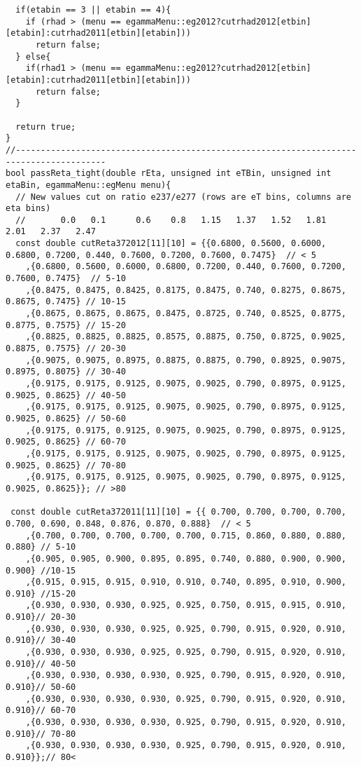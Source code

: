 \begin{lstlisting}
  if(etabin == 3 || etabin == 4){
    if (rhad > (menu == egammaMenu::eg2012?cutrhad2012[etbin][etabin]:cutrhad2011[etbin][etabin]))
      return false;
  } else{
    if(rhad1 > (menu == egammaMenu::eg2012?cutrhad2012[etbin][etabin]:cutrhad2011[etbin][etabin]))
      return false;
  }

  return true;
}
//----------------------------------------------------------------------------------------
bool passReta_tight(double rEta, unsigned int eTBin, unsigned int etaBin, egammaMenu::egMenu menu){
  // New values cut on ratio e237/e277 (rows are eT bins, columns are eta bins)
  //       0.0   0.1      0.6    0.8   1.15   1.37   1.52   1.81    2.01   2.37   2.47
  const double cutReta372012[11][10] = {{0.6800, 0.5600, 0.6000, 0.6800, 0.7200, 0.440, 0.7600, 0.7200, 0.7600, 0.7475}  // < 5
	,{0.6800, 0.5600, 0.6000, 0.6800, 0.7200, 0.440, 0.7600, 0.7200, 0.7600, 0.7475}  // 5-10
	,{0.8475, 0.8475, 0.8425, 0.8175, 0.8475, 0.740, 0.8275, 0.8675, 0.8675, 0.7475} // 10-15
	,{0.8675, 0.8675, 0.8675, 0.8475, 0.8725, 0.740, 0.8525, 0.8775, 0.8775, 0.7575} // 15-20
	,{0.8825, 0.8825, 0.8825, 0.8575, 0.8875, 0.750, 0.8725, 0.9025, 0.8875, 0.7575} // 20-30
	,{0.9075, 0.9075, 0.8975, 0.8875, 0.8875, 0.790, 0.8925, 0.9075, 0.8975, 0.8075} // 30-40
	,{0.9175, 0.9175, 0.9125, 0.9075, 0.9025, 0.790, 0.8975, 0.9125, 0.9025, 0.8625} // 40-50
	,{0.9175, 0.9175, 0.9125, 0.9075, 0.9025, 0.790, 0.8975, 0.9125, 0.9025, 0.8625} // 50-60
	,{0.9175, 0.9175, 0.9125, 0.9075, 0.9025, 0.790, 0.8975, 0.9125, 0.9025, 0.8625} // 60-70
	,{0.9175, 0.9175, 0.9125, 0.9075, 0.9025, 0.790, 0.8975, 0.9125, 0.9025, 0.8625} // 70-80
	,{0.9175, 0.9175, 0.9125, 0.9075, 0.9025, 0.790, 0.8975, 0.9125, 0.9025, 0.8625}}; // >80
				    
 const double cutReta372011[11][10] = {{ 0.700, 0.700, 0.700, 0.700, 0.700, 0.690, 0.848, 0.876, 0.870, 0.888}  // < 5
	,{0.700, 0.700, 0.700, 0.700, 0.700, 0.715, 0.860, 0.880, 0.880, 0.880} // 5-10
	,{0.905, 0.905, 0.900, 0.895, 0.895, 0.740, 0.880, 0.900, 0.900, 0.900} //10-15 
	,{0.915, 0.915, 0.915, 0.910, 0.910, 0.740, 0.895, 0.910, 0.900, 0.910} //15-20 
	,{0.930, 0.930, 0.930, 0.925, 0.925, 0.750, 0.915, 0.915, 0.910, 0.910}// 20-30
	,{0.930, 0.930, 0.930, 0.925, 0.925, 0.790, 0.915, 0.920, 0.910, 0.910}// 30-40
	,{0.930, 0.930, 0.930, 0.925, 0.925, 0.790, 0.915, 0.920, 0.910, 0.910}// 40-50
	,{0.930, 0.930, 0.930, 0.930, 0.925, 0.790, 0.915, 0.920, 0.910, 0.910}// 50-60
	,{0.930, 0.930, 0.930, 0.930, 0.925, 0.790, 0.915, 0.920, 0.910, 0.910}// 60-70
	,{0.930, 0.930, 0.930, 0.930, 0.925, 0.790, 0.915, 0.920, 0.910, 0.910}// 70-80
	,{0.930, 0.930, 0.930, 0.930, 0.925, 0.790, 0.915, 0.920, 0.910, 0.910}};// 80<




\end{lstlisting}
